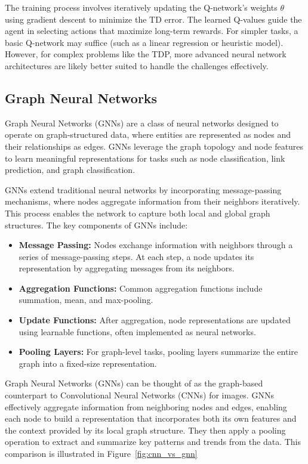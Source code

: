 \documentclass[runningheads]{llncs}
\begin{document}
The training process involves iteratively updating the Q-network's weights $\theta$ using gradient descent to minimize the TD error. 
The learned Q-values guide the agent in selecting actions that maximize long-term rewards.
For simpler tasks, a basic Q-network may suffice (such as a linear regression or heuristic model). 
However, for complex problems like the TDP, more advanced neural network architectures are likely better suited to handle the challenges effectively.


\subsection{Graph Neural Networks}
\label{sss:gnn}
Graph Neural Networks (GNNs) are a class of neural networks designed to operate on graph-structured data, where entities are represented as nodes and their relationships as edges. 
GNNs leverage the graph topology and node features to learn meaningful representations for tasks such as node classification, link prediction, and graph classification.

GNNs extend traditional neural networks by incorporating message-passing mechanisms, where nodes aggregate information from their neighbors iteratively. 
This process enables the network to capture both local and global graph structures. 
The key components of GNNs include:

\begin{itemize}
    \item \textbf{Message Passing:} Nodes exchange information with neighbors through a series of message-passing steps. At each step, a node updates its representation by aggregating messages from its neighbors.
    \item \textbf{Aggregation Functions:} Common aggregation functions include summation, mean, and max-pooling.
    \item \textbf{Update Functions:} After aggregation, node representations are updated using learnable functions, often implemented as neural networks.
    \item \textbf{Pooling Layers:} For graph-level tasks, pooling layers summarize the entire graph into a fixed-size representation.
\end{itemize}

Graph Neural Networks (GNNs) can be thought of as the graph-based counterpart to Convolutional Neural Networks (CNNs) for images. 
GNNs effectively aggregate information from neighboring nodes and edges, enabling each node to build a representation that incorporates both its own features and the context provided by its local graph structure.
They then apply a pooling operation to extract and summarize key patterns and trends from the data.
This comparison is illustrated in Figure~\ref{fig:cnn_vs_gnn}
\end{document}
